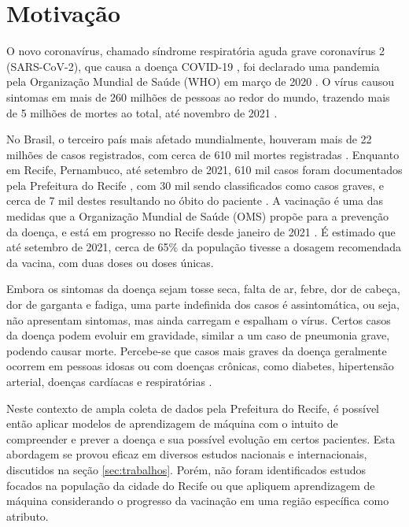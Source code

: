 \section{Motivação}
\label{motivacao}

O novo coronavírus, chamado síndrome respiratória aguda grave coronavírus 2 (SARS-CoV-2), que causa a doença COVID-19 \cite{sars-name}, foi declarado uma pandemia pela Organização Mundial de Saúde (WHO) em março de 2020 \cite{oms}. O vírus causou sintomas em mais de 260 milhões de pessoas ao redor do mundo, trazendo mais de 5 milhões de mortes ao total, até novembro de 2021 \cite{contagem-global}.

No Brasil, o terceiro país mais afetado mundialmente, houveram mais de 22 milhões de casos registrados, com cerca de 610 mil mortes registradas \cite{contagem-global}. Enquanto em Recife, Pernambuco, até setembro de 2021, 610 mil casos foram documentados pela Prefeitura do Recife \cite{casosleves}, com 30 mil sendo classificados como casos graves, e cerca de 7 mil destes resultando no óbito do paciente \cite{casosgraves}. A vacinação é uma das medidas que a Organização Mundial de Saúde (OMS) propõe para a prevenção da doença, e está em progresso no Recife desde janeiro de 2021 \cite{vacinometro}. É estimado que até setembro de 2021, cerca de 65\% da população \cite{populacaorecife} tivesse a dosagem recomendada da vacina, com duas doses ou doses únicas.

Embora os sintomas da doença sejam tosse seca, falta de ar, febre, dor de cabeça, dor de garganta e fadiga, uma parte indefinida dos casos é assintomática, ou seja, não apresentam sintomas, mas ainda carregam e espalham o vírus. Certos casos da doença podem evoluir em gravidade, similar a um caso de pneumonia grave, podendo causar morte. Percebe-se que casos mais graves da doença geralmente ocorrem em pessoas idosas ou com doenças crônicas, como diabetes, hipertensão arterial, doenças cardíacas e respiratórias \cite{patologia}.

Neste contexto de ampla coleta de dados pela Prefeitura do Recife, é possível então aplicar modelos de aprendizagem de máquina com o intuito de compreender e prever a doença e sua possível evolução em certos pacientes. Esta abordagem se provou eficaz em diversos estudos nacionais e internacionais, discutidos na seção \ref{sec:trabalhos}. Porém, não foram identificados estudos focados na população da cidade do Recife ou que apliquem aprendizagem de máquina considerando o progresso da vacinação em uma região específica como atributo.


% 
